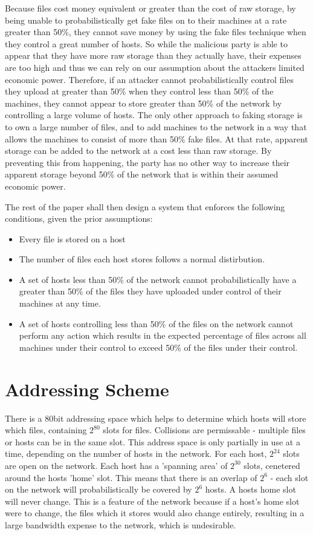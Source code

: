 \documentclass[twocolumn]{article}
\begin{document}
Because files cost money equivalent or greater than the cost of raw storage, by being unable to probabilistically get fake files on to their machines at a rate greater than 50\%, they cannot save money by using the fake files technique when they control a great number of hosts.
So while the malicious party is able to appear that they have more raw storage than they actually have, their expenses are too high and thus we can rely on our assumption about the attackers limited economic power.
Therefore, if an attacker cannot probabilistically control files they upload at greater than 50\% when they control less than 50\% of the machines, they cannot appear to store greater than 50\% of the network by controlling a large volume of hosts.
The only other approach to faking storage is to own a large number of files, and to add machines to the network in a way that allows the machines to consist of more than 50\% fake files.
At that rate, apparent storage can be added to the network at a cost less than raw storage.
By preventing this from happening, the party has no other way to increase their apparent storage beyond 50\% of the network that is within their assumed economic power.

The rest of the paper shall then design a system that enforces the following conditions, given the prior assumptions:
\begin{itemize}
	\item Every file is stored on a host
	\item The number of files each host stores follows a normal distirbution.
	\item A set of hosts less than 50\% of the network cannot probabilistically have a greater than 50\% of the files they have uploaded under control of their machines at any time.
	\item A set of hosts controlling less than 50\% of the files on the network cannot perform any action which results in the expected percentage of files across all machines under their control to exceed 50\% of the files under their control.
\end{itemize}

\section{Addressing Scheme}
There is a 80bit addressing space which helps to determine which hosts will store which files, containing $2^{80}$ slots for files.
Collisions are permissable - multiple files or hosts can be in the same slot.
This address space is only partially in use at a time, depending on the number of hosts in the network. For each host, $2^{24}$ slots are open on the network.
Each host has a 'spanning area' of $2^{30}$ slots, cenetered around the hosts 'home' slot. This means that there is an overlap of $2^6$ - each slot on the network will probabilistically be covered by $2^6$ hosts.
A hosts home slot will never change.
This is a feature of the network because if a host's home slot were to change, the files which it stores would also change entirely, resulting in a large bandwidth expense to the network, which is undesirable.
\end{document}
